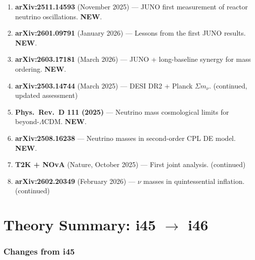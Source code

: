 \documentclass[11pt,a4paper]{article}
\newcommand{\NEW}{\textcolor{dfdblue}{\textbf{NEW}}}
\begin{document}
\begin{enumerate}
\item \textbf{arXiv:2511.14593} (November 2025) --- JUNO first measurement of reactor neutrino oscillations. \NEW.
\item \textbf{arXiv:2601.09791} (January 2026) --- Lessons from the first JUNO results. \NEW.
\item \textbf{arXiv:2603.17181} (March 2026) --- JUNO + long-baseline synergy for mass ordering. \NEW.
\item \textbf{arXiv:2503.14744} (March 2025) --- DESI DR2 + Planck $\Sigma m_\nu$. (continued, updated assessment)
\item \textbf{Phys.\ Rev.\ D 111 (2025)} --- Neutrino mass cosmological limits for beyond-$\Lambda$CDM. \NEW.
\item \textbf{arXiv:2508.16238} --- Neutrino masses in second-order CPL DE model. \NEW.
\item \textbf{T2K + NOvA} (Nature, October 2025) --- First joint analysis. (continued)
\item \textbf{arXiv:2602.20349} (February 2026) --- $\nu$ masses in quintessential inflation. (continued)
\end{enumerate}


\part{Theory Summary: i45 $\to$ i46}

\section{Changes from i45}
\end{document}
